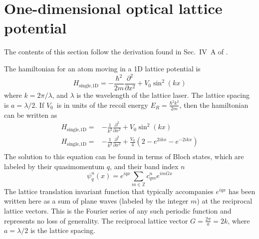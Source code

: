 \documentclass[oneside,11pt]{memoir}
\newcommand{\vo}{\ensuremath{V_{0}}}
\newcommand{\er}{\ensuremath{E_{R}}}
\begin{document}
\section{One-dimensional optical lattice potential}

The contents of this section follow the derivation found in Sec.~IV~A of
\cite{RevModPhys.78.179}.

The hamiltonian for an atom moving in a 1D lattice potential is 
\begin{equation}
  H_{\text{single,1D}} = 
  - \frac{\hbar^{2}}{2m} \frac{\partial^{2}}{\partial x^{2}} 
  + \vo\sin^{2}(kx) 
 \label{eq:Hsingle1D}
\end{equation}
where $k=2\pi/\lambda$, and $\lambda$ is the wavelength of the lattice laser.
The lattice spacing is $a=\lambda/2$.  If \vo\ is in units of the recoil energy
$\er=\frac{\hbar^{2}k^{2}}{2m}$, then the hamiltonian can be written as
\begin{equation}
\begin{split}
  H_{\text{single,1D}}= &
    -\frac{1}{k^{2}} \frac{\partial^{2}}{\partial x^{2}} 
    + \vo\sin^{2}(kx) \\
  H_{\text{single,1D}} = &
    -\frac{1}{k^{2}} \frac{\partial^{2}}{\partial x^{2}} 
    + \frac{\vo}{4}(2 - e^{2ikx} - e^{-2ikx} )  \\
\end{split}
\end{equation}
The solution to this equation can be found in terms of Bloch states, which are
labeled by their quasimomentum $q$, and their band index $n$ \begin{equation}
  \psi_{q}^{n}(x) = e^{iqx} \sum_{m \in \mathbb{Z}} c_{qm}^{n} e^{imGx}
  \label{eq:blochstate}
\end{equation}
The lattice translation invariant function that typically accompanies $e^{iqx}$
has been written here as a sum of plane waves (labeled by the integer $m$) at
the reciprocal lattice vectors.  This is the Fourier series of any such
periodic function and represents no loss of generality.   The reciprocal
lattice vector  $G=\frac{2\pi}{a}=2k$, where $a=\lambda/2$ is the lattice
spacing.  
\end{document}
